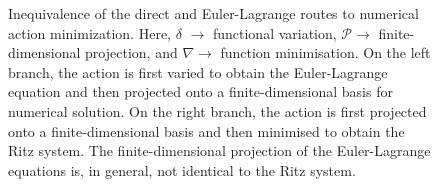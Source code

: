 \begin{figure}
\begin{center}
\end{center}  
\begin{center}
\vspace{-0.6cm}
\end{center}  


\caption{Inequivalence of the direct and Euler-Lagrange routes to numerical
action minimization. Here, $\delta$ $\rightarrow$ functional variation,
$\mathcal{P}\rightarrow$ finite-dimensional projection, and $\nabla\rightarrow$
function minimisation. On the left branch, the action is first varied
to obtain the Euler-Lagrange equation and then projected onto a finite-dimensional
basis for numerical solution. On the right branch, the action is first
projected onto a finite-dimensional basis and then minimised to obtain
the Ritz system. The finite-dimensional projection of the Euler-Lagrange
equations is, in general, not identical to the Ritz system.}

\centering{}\label{fig:discrete-el-versus-ritz}
\end{figure}

